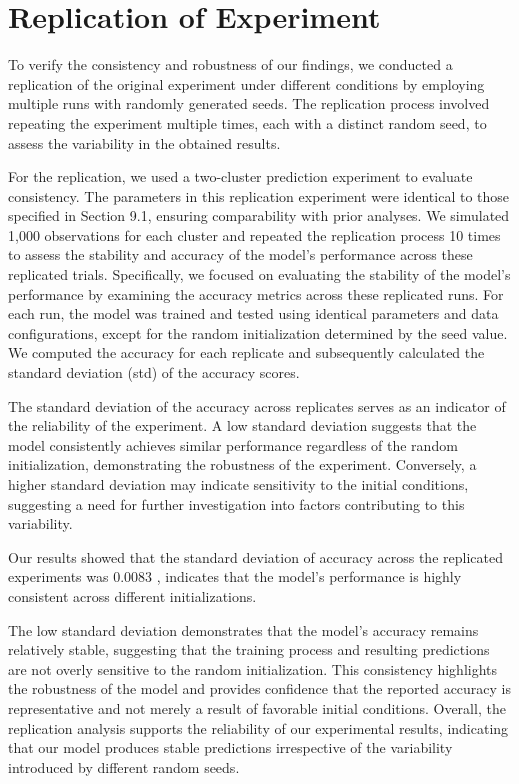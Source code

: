 \documentclass{article}
\begin{document}
\clearpage

\section{Replication of Experiment}

To verify the consistency and robustness of our findings, we conducted a replication of the original experiment under different conditions by employing multiple runs with randomly generated seeds. The replication process involved repeating the experiment multiple times, each with a distinct random seed, to assess the variability in the obtained results.

For the replication, we used a two-cluster prediction experiment to evaluate consistency. The parameters in this replication experiment were identical to those specified in Section 9.1, ensuring comparability with prior analyses. We simulated 1,000 observations for each cluster and repeated the replication process 10 times to assess the stability and accuracy of the model's performance across these replicated trials.
Specifically, we focused on evaluating the stability of the model's performance by examining the accuracy metrics across these replicated runs. For each run, the model was trained and tested using identical parameters and data configurations, except for the random initialization determined by the seed value. We computed the accuracy for each replicate and subsequently calculated the standard deviation (std) of the accuracy scores.

The standard deviation of the accuracy across replicates serves as an indicator of the reliability of the experiment. A low standard deviation suggests that the model consistently achieves similar performance regardless of the random initialization, demonstrating the robustness of the experiment. Conversely, a higher standard deviation may indicate sensitivity to the initial conditions, suggesting a need for further investigation into factors contributing to this variability.

Our results showed that the standard deviation of accuracy across the replicated experiments was 
0.0083
, indicates that the model’s performance is highly consistent across different initializations.

The low standard deviation demonstrates that the model’s accuracy remains relatively stable, suggesting
that the training process and resulting predictions are not overly sensitive to the random initialization. 
This consistency highlights the robustness of the model and provides confidence that the
reported accuracy is representative and not merely a result of favorable initial conditions.
Overall, the replication analysis supports the reliability of our experimental results, indicating that our
model produces stable predictions irrespective of the variability introduced by different random seeds.
\end{document}
